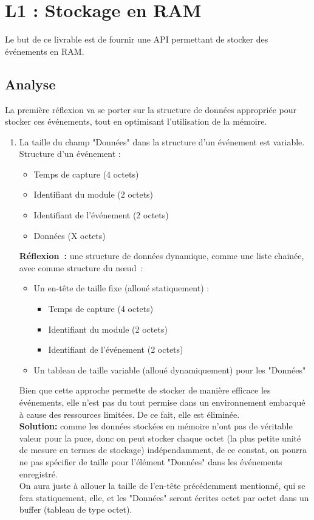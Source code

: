 \documentclass[a4paper, 12pt]{report}
\begin{document}
\section{L1 : Stockage en RAM}
Le but de ce livrable est de fournir une API permettant de stocker des événements en RAM.


\subsection{Analyse}
La première réflexion va se porter sur la structure de données appropriée pour stocker ces événements, tout en optimisant l'utilisation de la mémoire.
\begin{enumerate}
    \item La taille du champ "Données" dans la structure d'un événement est variable.\\
    Structure d'un événement :
\begin{itemize}
    \item Temps de capture (4 octets)
    \item Identifiant du module (2 octets)
    \item Identifiant de l'événement (2 octets)
    \item Données (X octets)
\end{itemize}
    \textbf{Réflexion :} une structure de données dynamique, comme une liste chainée, avec comme structure du nœud :
    \begin{itemize}
        \item Un en-tête de taille fixe (alloué statiquement) :
        \begin{itemize}
                \item Temps de capture (4 octets)
                \item Identifiant du module (2 octets)
                \item Identifiant de l'événement (2 octets)
        \end{itemize}
        \item Un tableau de taille variable (alloué dynamiquement) pour les "Données"\\
    \end{itemize}

    Bien que cette approche permette de stocker de manière efficace les événements, elle n'est pas du tout permise dans un environnement embarqué à cause des ressources limitées. De ce fait, elle est éliminée.\\

    \textbf{Solution:} comme les données stockées en mémoire n'ont pas de véritable valeur pour la puce, donc on peut stocker chaque octet (la plus petite unité de mesure en termes de stockage) indépendamment, de ce constat, on pourra ne pas spécifier de taille pour l'élément "Données" dans les événements enregistré.\\
    On aura juste à allouer la taille de l'en-tête précédemment mentionné, qui se fera statiquement, elle, et les "Données" seront écrites octet par octet dans un buffer (tableau de type octet).
    

\end{enumerate}
\end{document}
